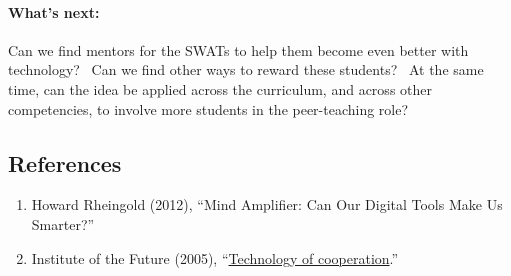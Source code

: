\hypertarget{whats-next}{%
\paragraph{What's next:}\label{whats-next}}

Can we find mentors for the SWATs to help them become even better with
technology? ~Can we find other ways to reward these students? ~At the
same time, can the idea be applied across the curriculum, and across
other competencies, to involve more students in the peer-teaching role?

\hypertarget{references}{%
\subsection{References}\label{references}}

\begin{enumerate}
\def\labelenumi{\arabic{enumi}.}
\item
  Howard Rheingold (2012), ``Mind Amplifier: Can Our Digital Tools Make
  Us Smarter?''
\item
  Institute of the Future (2005),
  ``\href{http://www.rheingold.com/cooperation/Technology_of_cooperation.pdf}{Technology
  of cooperation}.''
\end{enumerate}
